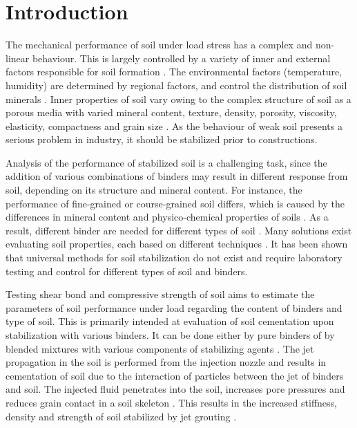 \documentclass[USenglish,twocolumn]{article}
\begin{document}


  
\maketitle

\section{Introduction}
The mechanical performance of soil under load stress has a complex and non-linear behaviour. This is largely controlled by a variety of inner and external factors responsible for soil formation \cite{Jenny,Buol,Winterkorn1991a}. The environmental factors (temperature, humidity) are determined by regional factors, and control the distribution of soil minerals \cite{Righi1995,Nesse}. Inner properties of soil vary owing to the complex structure of soil as a porous media with varied mineral content, texture, density, porosity, viscosity, elasticity, compactness and grain size \cite{Kaellenetal2014,Kallenetal2016}. As the behaviour of weak soil presents a serious problem in industry, it should be stabilized prior to constructions. 

Analysis of the performance of stabilized soil is a challenging task, since the addition of various combinations of binders may result in different response from soil, depending on its structure and mineral content. For instance, the performance of fine-grained \cite{Mitchell} or course-grained soil \cite{Wangetal2009} differs, which is caused by the differences in mineral content and physico-chemical properties of soils \cite{Lambe}. As a result, different binder are needed for different types of soil \cite{Lindh2001,Guoetal2003}. Many solutions exist evaluating soil properties, each based on different techniques \cite{Lindh2004,Glendinning,Lindh202201,NIGITHA2022,Lemenkov2021c}. It has been shown that universal methods for soil stabilization do not exist and require laboratory testing and control for different types of soil and binders.

Testing shear bond and compressive strength of soil aims to estimate the parameters of soil performance under load regarding the content of binders and type of soil. This is primarily intended at evaluation of soil cementation upon stabilization with various binders. It can be done either by pure binders of by blended mixtures with various components of stabilizing agents \citep{HOV2022101162,Bakaiyang}. The jet propagation in the soil is performed from the injection nozzle and results in cementation of soil due to the interaction of particles between the jet of binders and soil. The injected fluid penetrates into the soil, increases pore pressures and reduces grain contact in a soil skeleton \cite{Modonietal2006,Croceetal2014}. This results in the increased stiffness, density and strength of soil stabilized by jet grouting \cite{Modonietal2019}.
\end{document}
